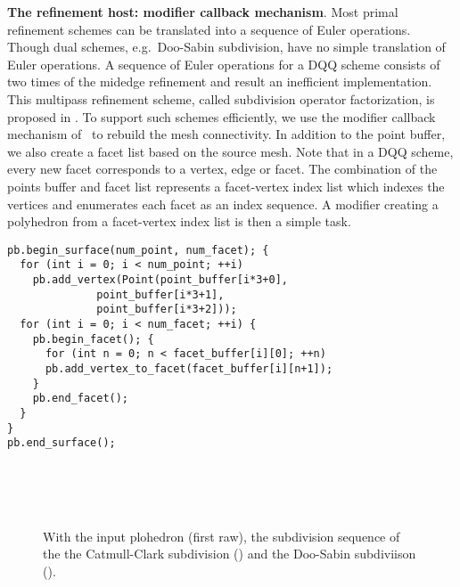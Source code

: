 \noindent\textbf{The refinement host: modifier callback mechanism}.
Most primal refinement schemes can be translated into a sequence of
Euler operations. Though dual schemes, e.g.\ Doo-Sabin subdivision,
have no simple translation of Euler operations. A sequence
of Euler operations for a DQQ scheme consists of two times 
of the midedge refinement \cite{Peters:1997:SSS} and 
result an inefficient implementation. This multipass 
refinement scheme, called subdivision operator factorization, 
is proposed in \cite{Peter:2003:CPDSS}.
To support such schemes efficiently, we use the modifier 
callback mechanism of \cgalpoly\ to rebuild the mesh
connectivity. In addition to the point buffer, we
also create a facet list based on the source mesh. Note that in a DQQ
scheme, every new facet corresponds to a vertex, edge or facet. The
combination of the points buffer and facet list represents a
facet-vertex index list which indexes the vertices and enumerates each
facet as an index sequence. A modifier creating a polyhedron from a
facet-vertex index list is then a simple task.
\begin{lstlisting}
pb.begin_surface(num_point, num_facet); {
  for (int i = 0; i < num_point; ++i) 
    pb.add_vertex(Point(point_buffer[i*3+0], 
	          point_buffer[i*3+1], 
	          point_buffer[i*3+2]));	
  for (int i = 0; i < num_facet; ++i) {
    pb.begin_facet(); {
      for (int n = 0; n < facet_buffer[i][0]; ++n)
      pb.add_vertex_to_facet(facet_buffer[i][n+1]);
    }
    pb.end_facet();
  }
}
pb.end_surface();
\end{lstlisting}


\begin{figure}
  \centering
  \\
  \vspace{0.3cm}
  \\
  \vspace{0.3cm}
  \\
  \vspace{0.3cm}
  \caption{ With the input plohedron (first raw), 
  the subdivision sequence of the 
  the Catmull-Clark subdivision (\IL) and
  the Doo-Sabin subdiviison (\IR).}
  \label{fig:SubExample}
\end{figure}

